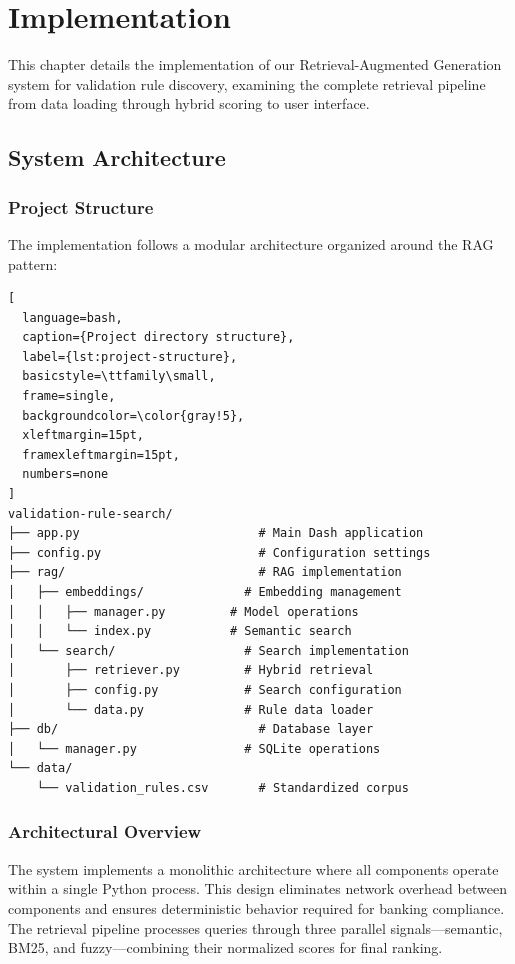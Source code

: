 \chapter{Implementation}\label{ch:implementation}

This chapter details the implementation of our Retrieval-Augmented Generation system for validation rule discovery, examining the complete retrieval pipeline from data loading through hybrid scoring to user interface.

\section{System Architecture}

\subsection{Project Structure}

The implementation follows a modular architecture organized around the RAG pattern:

\begin{lstlisting}[
  language=bash, 
  caption={Project directory structure}, 
  label={lst:project-structure},
  basicstyle=\ttfamily\small,
  frame=single,
  backgroundcolor=\color{gray!5},
  xleftmargin=15pt,
  framexleftmargin=15pt,
  numbers=none
]
validation-rule-search/
├── app.py                         # Main Dash application
├── config.py                      # Configuration settings
├── rag/                           # RAG implementation
│   ├── embeddings/              # Embedding management
│   │   ├── manager.py         # Model operations
│   │   └── index.py           # Semantic search
│   └── search/                  # Search implementation
│       ├── retriever.py         # Hybrid retrieval
│       ├── config.py            # Search configuration
│       └── data.py              # Rule data loader
├── db/                            # Database layer
│   └── manager.py               # SQLite operations
└── data/
    └── validation_rules.csv       # Standardized corpus
\end{lstlisting}

\subsection{Architectural Overview}

The system implements a monolithic architecture where all components operate within a single Python process. This design eliminates network overhead between components and ensures deterministic behavior required for banking compliance. The retrieval pipeline processes queries through three parallel signals—semantic, BM25, and fuzzy—combining their normalized scores for final ranking.

